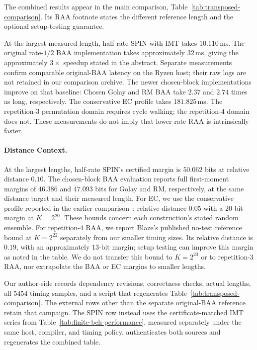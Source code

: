 The combined results appear in the main comparison,
Table~\ref{tab:transposed-comparison}. Its RAA footnote states the different
reference length and the optional setup-testing guarantee.

At the largest measured length, half-rate SPIN with IMT takes $10.110$\,ms.
The original rate-$1/2$ BAA implementation takes approximately $32$\,ms,
giving the approximately $3\times$ speedup stated in the abstract.
Separate measurements confirm comparable original-BAA latency on the
Ryzen host; their raw logs are not retained in our comparison archive.
The newer chosen-block implementations improve on that baseline:
Chosen Golay and RM BAA take $2.37$ and $2.74$ times as long,
respectively. The conservative EC profile takes $181.825$\,ms.
The repetition-$3$ permutation domain requires cycle walking; the
repetition-$4$ domain does not. These measurements do not imply that
lower-rate RAA is intrinsically faster.

\paragraph{Distance Context.}
At the largest lengths, half-rate SPIN's certified margin is $50.062$ bits at
relative distance $0.10$. The chosen-block BAA evaluation reports full
first-moment margins of $46.386$ and $47.093$ bits for Golay and RM,
respectively, at the same distance target and their measured length.
For EC, we use the conservative profile reported in the earlier
comparison~\cite{KolesnikovEtAl2026BA}: relative distance $0.05$ with
a $20$-bit margin at $K=2^{20}$. These bounds concern each construction's
stated random ensemble. For repetition-$4$ RAA, we report Blaze's
published no-test reference bound at $K=2^{22}$ separately from our
smaller timing sizes. Its relative distance is $0.19$, with an approximately
$13$-bit margin; setup testing can improve this margin as noted in the table.
We do not transfer this bound to $K=2^{20}$ or to repetition-$3$ RAA,
nor extrapolate the BAA or EC margins to smaller lengths.

Our author-side 
records dependency revisions, correctness checks, actual lengths, all
$5454$ timing samples, and a script that regenerates
Table~\ref{tab:transposed-comparison}. The external rows other than the
separate original-BAA reference retain that campaign. The SPIN row instead uses the
certificate-matched IMT series from Table~\ref{tab:finite-bch-performance},
measured separately under the same host, compiler, and timing policy.
 authenticates both sources and
regenerates the combined table.
\FloatBarrier
